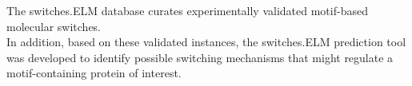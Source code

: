 \documentclass[a4paper,10pt,xcolor=pdftex,dvipsnames,table]{beamer}
\begin{document}
\begin{frame}\frametitle{\insertsection}
    \switcheslogo
    \note{~}
\begin{exampleblock}{}
    The switches.ELM \alert{database} curates experimentally validated motif-based molecular switches.\\
    In addition, based on these validated instances, the switches.ELM \alert{prediction} tool was developed to identify possible switching mechanisms that might regulate a motif-containing protein of interest. 
\end{exampleblock}

    \begin{center}
    \end{center}
\end{frame}
\end{document}
